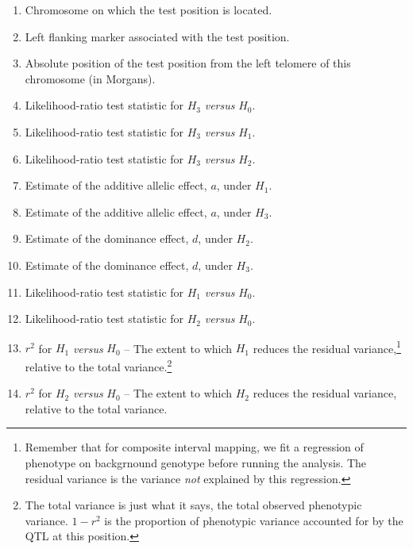 \begin{enumerate}

\item Chromosome on which the test position is located.

\item Left flanking marker associated with the test position.

\item Absolute position of the test position from the left telomere of
  this chromosome (in Morgans).

\item Likelihood-ratio test statistic for $H_3$ {\it versus\/} $H_0$. 

\item Likelihood-ratio test statistic for $H_3$ {\it versus\/} $H_1$. 

\item Likelihood-ratio test statistic for $H_3$ {\it versus\/} $H_2$. 

\item Estimate of the additive allelic effect, $a$, under $H_1$.

\item Estimate of the additive allelic effect, $a$, under $H_3$.

\item Estimate of the dominance effect, $d$, under $H_2$.

\item Estimate of the dominance effect, $d$, under $H_3$.

\item Likelihood-ratio test statistic for $H_1$ {\it versus\/} $H_0$. 

\item Likelihood-ratio test statistic for $H_2$ {\it versus\/} $H_0$. 

\item $r^2$ for $H_1$ {\it versus\/} $H_0$ -- The extent to which
  $H_1$ reduces the residual variance,\footnote{Remember that for
    composite interval mapping, we fit a regression of phenotype on
    backgrnound genotype before running the analysis. The residual
    variance is the variance {\it not\/} explained by this
    regression.} relative to the total variance.\footnote{The total
    variance is just what it says, the total observed phenotypic
    variance. $1-r^2$ is the proportion of phenotypic variance
    accounted for by the QTL at this position.}

\item $r^2$ for $H_2$ {\it versus\/} $H_0$ -- The extent to which
  $H_2$ reduces the residual variance, relative to the total
  variance. 


\end{enumerate}
